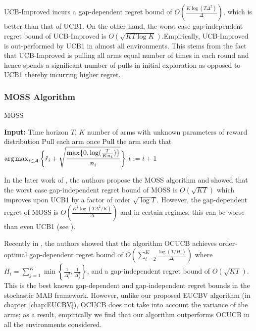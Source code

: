     UCB-Improved incurs a gap-dependent regret bound of $O\left(\frac{K\log (T\Delta^{2})}{\Delta}\right)$, which is better than that of UCB1. On the other hand, the worst case gap-independent regret bound of UCB-Improved is $O\left(\sqrt{KT\log K}\right)$.Empirically, UCB-Improved is out-performed by UCB1 in almost all environments. This stems from the fact that UCB-Improved is pulling all arms equal number of times in each round and hence spends a significant number of pulls in initial exploration as opposed to UCB1 thereby incurring higher regret.
        
    
\subsubsection{MOSS Algorithm}    

\begin{algorithm}[!th]
\caption{MOSS}
\label{alg:moss}
\begin{algorithmic}[1]
\State \textbf{Input:} Time horizon $T$, $K$ number of arms with unknown parameters of reward distribution
\State Pull each arm once
\State Pull the arm such that $\operatorname*{arg\,max}_{i\in \mathcal{A}}\bigg\lbrace\hat{r}_{i} + \sqrt{\dfrac{\max\lbrace 0,\log(\frac{T}{K n_i})\rbrace}{n_i}}\bigg\rbrace$
\State $t:=t+1 $
 \EndFor
\end{algorithmic}
\end{algorithm}
    
    In the later work of \citet{audibert2009minimax}, the authors propose the MOSS algorithm and showed that the worst case gap-independent regret bound of MOSS is $O\left( \sqrt{KT} \right)$ which improves upon UCB1 by a factor of order $\sqrt{\log T}$. However, the gap-dependent regret of MOSS is $O\left( \frac{K^{2}\log\left(T\Delta^{2}/K\right)}{\Delta}\right)$ and in certain regimes, this can be worse than even UCB1 (see \citet{audibert2009minimax,lattimore2015optimally}).
    
Recently in \citet{lattimore2015optimally}, the authors showed that  the algorithm OCUCB achieves order-optimal gap-dependent regret bound of $O\left(\sum_{i=2}^{K}\frac{\log\left(T/H_i\right)}{\Delta_i}\right)$ where $H_i=\sum_{j=1}^{K}\min\left\lbrace \frac{1}{\Delta_i^2},\frac{1}{\Delta_j^2}\right\rbrace$, and a gap-independent regret bound of $O\left( \sqrt{KT}\right)$. This is the best known gap-dependent and gap-independent regret bounds in the stochastic MAB framework. However, unlike our proposed EUCBV algorithm (in chapter \ref{chap:EUCBV}), OCUCB does not take into account the variance of the arms; as a result, empirically  we find  that our algorithm outperforms OCUCB in all the environments considered. 

